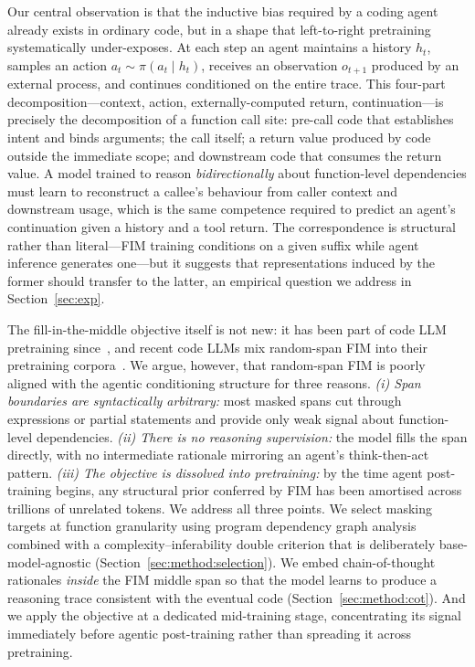 Our central observation is that the inductive bias required by a coding
agent already exists in ordinary code, but in a shape that left-to-right
pretraining systematically under-exposes. At each step an agent maintains a
history $h_t$, samples an action $a_t \sim \pi(a_t \mid h_t)$, receives an
observation $o_{t+1}$ produced by an external process, and continues
conditioned on the entire trace. This four-part decomposition---context,
action, externally-computed return, continuation---is precisely the
decomposition of a function call site: pre-call code that establishes intent
and binds arguments; the call itself; a return value produced by code
outside the immediate scope; and downstream code that consumes the return
value. A model trained to reason \emph{bidirectionally} about function-level
dependencies must learn to reconstruct a callee's behaviour from caller
context and downstream usage, which is the same competence required to
predict an agent's continuation given a history and a tool return. The
correspondence is structural rather than literal---FIM training conditions
on a given suffix while agent inference generates one---but it suggests
that representations induced by the former should transfer to the latter,
an empirical question we address in Section~\ref{sec:exp}.

The fill-in-the-middle objective itself is not new: it has been part of code
LLM pretraining since~\citet{TODO_bavarian2022}, and recent code LLMs mix
random-span FIM into their pretraining
corpora~\citep{TODO_qwen_coder, TODO_deepseek_coder, TODO_starcoder}. We
argue, however, that random-span FIM is poorly aligned with the agentic
conditioning structure for three reasons. \emph{(i) Span boundaries are
syntactically arbitrary:} most masked spans cut through expressions or
partial statements and provide only weak signal about function-level
dependencies. \emph{(ii) There is no reasoning supervision:} the model
fills the span directly, with no intermediate rationale mirroring an
agent's think-then-act pattern. \emph{(iii) The objective is dissolved
into pretraining:} by the time agent post-training begins, any structural
prior conferred by FIM has been amortised across trillions of unrelated
tokens. We address all three points. We select masking targets at function
granularity using program dependency graph analysis combined with a
complexity--inferability double criterion that is deliberately
base-model-agnostic (Section~\ref{sec:method:selection}). We embed
chain-of-thought rationales \emph{inside} the FIM middle span so that the
model learns to produce a reasoning trace consistent with the eventual
code (Section~\ref{sec:method:cot}). And we apply the objective at a
dedicated mid-training stage, concentrating its signal immediately before
agentic post-training rather than spreading it across pretraining.

